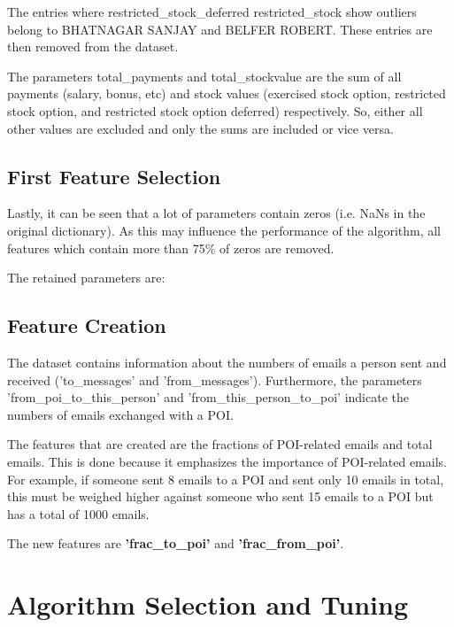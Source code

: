 \documentclass[11pt]{article} %
\begin{document}
The entries where restricted\_stock\_deferred restricted\_stock show outliers belong to BHATNAGAR SANJAY and BELFER ROBERT. These entries are then removed from the dataset.\medskip

The parameters total\_payments and total\_stockvalue are the sum of all payments (salary, bonus, etc) and stock values (exercised stock option, restricted stock option, and restricted stock option deferred) respectively. So, either all other values are excluded and only the sums are included or vice versa.

\subsection{First Feature Selection}
Lastly, it can be seen that a lot of parameters contain zeros (i.e. NaNs in the original dictionary). As this may influence the performance of the algorithm, all features which contain more than 75\% of zeros are removed.\medskip

The retained parameters are:

{}

\subsection{Feature Creation}

The dataset contains information about the numbers of emails a person sent and received ('to\_messages' and 'from\_messages'). Furthermore, the parameters 'from\_poi\_to\_this\_person' and 'from\_this\_person\_to\_poi' indicate the numbers of emails exchanged with a POI.\medskip

The features that are created are the fractions of POI-related emails and total emails. This is done because it emphasizes the importance of POI-related emails. For example, if someone sent 8 emails to a POI and sent only 10 emails in total, this must be weighed higher against someone who sent 15 emails to a POI but has a total of 1000 emails.\medskip

The new features are \textbf{'frac\_to\_poi'} and  \textbf{'frac\_from\_poi'}.

\section{Algorithm Selection and Tuning}
\end{document}
